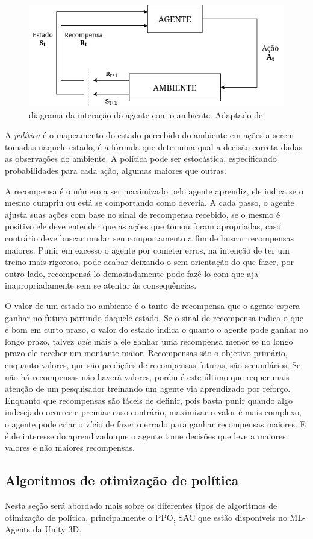 \begin{figure}[h]
   \centering
   \includegraphics[scale=0.75]{figs/RL-diagram.drawio.png}
    \caption{diagrama da interação do agente com o ambiente. Adaptado de }
    \label{fig:prefixt}
 \end{figure}

A \textit{política} é o mapeamento do estado percebido do ambiente em ações a serem tomadas naquele estado, é a fórmula que determina qual a decisão correta dadas as observações do ambiente. A política pode ser estocástica, especificando probabilidades para cada ação, algumas maiores que outras.

A recompensa é o número a ser maximizado pelo agente aprendiz, ele indica se o mesmo cumpriu ou está se comportando como deveria. A cada passo, o agente ajusta suas ações com base no sinal de recompensa recebido, se o mesmo é positivo ele deve entender que as ações que tomou foram apropriadas, caso contrário deve buscar mudar seu comportamento a fim de buscar recompensas maiores. Punir em excesso o agente por cometer erros, na intenção de ter um treino mais rigoroso, pode acabar deixando-o sem orientação do que fazer, por outro lado, recompensá-lo demasiadamente pode fazê-lo com que aja inapropriadamente sem se atentar às consequências.

O valor de um estado no ambiente é o tanto de recompensa que o agente espera ganhar no futuro partindo daquele estado. Se o sinal de recompensa indica o que é bom em curto prazo, o valor do estado indica o quanto o agente pode ganhar no longo prazo, talvez \textit{vale} mais a ele ganhar uma recompensa menor se no longo prazo ele receber um montante maior. Recompensas são o objetivo primário, enquanto valores, que são predições de recompensas futuras, são secundários. Se não há recompensas não haverá valores, porém é este último que requer mais atenção de um pesquisador treinando um agente via aprendizado por reforço. Enquanto que recompensas são fáceis de definir, pois basta punir quando algo indesejado ocorrer e premiar caso contrário, maximizar o valor é mais complexo, o agente pode criar o vício de fazer o errado para ganhar recompensas maiores. E é de interesse do aprendizado que o agente tome decisões que leve a maiores valores e não maiores recompensas.

\subsection{Algoritmos de otimização de política}
Nesta seção será abordado mais sobre os diferentes tipos de algoritmos de otimização de política, principalmente o PPO, SAC que estão disponíveis no ML-Agents da Unity 3D.